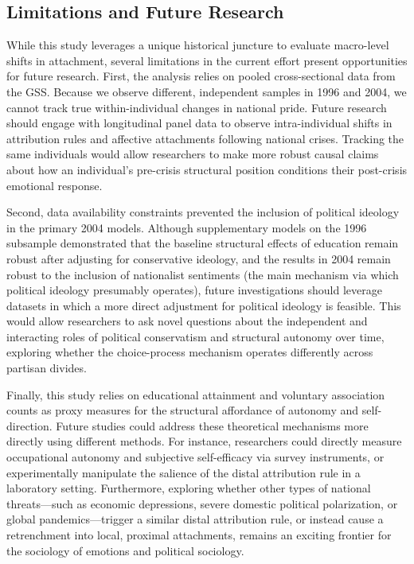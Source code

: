 \documentclass[12pt,letterpaper]{article}
\begin{document}
\subsection{Limitations and Future Research}
While this study leverages a unique historical juncture to evaluate macro-level shifts in attachment, several limitations in the current effort present opportunities for future research. First, the analysis relies on pooled cross-sectional data from the GSS. Because we observe different, independent samples in 1996 and 2004, we cannot track true within-individual changes in national pride. Future research should engage with longitudinal panel data to observe intra-individual shifts in attribution rules and affective attachments following national crises. Tracking the same individuals would allow researchers to make more robust causal claims about how an individual's pre-crisis structural position conditions their post-crisis emotional response.

Second, data availability constraints prevented the inclusion of political ideology in the primary 2004 models. Although supplementary models on the 1996 subsample demonstrated that the baseline structural effects of education remain robust after adjusting for conservative ideology, and the results in 2004 remain robust to the inclusion of nationalist sentiments (the main mechanism via which political ideology presumably operates), future investigations should leverage datasets in which a more direct adjustment for political ideology is feasible. This would allow researchers to ask novel questions about the independent and interacting roles of political conservatism and structural autonomy over time, exploring whether the choice-process mechanism operates differently across partisan divides. 

Finally, this study relies on educational attainment and voluntary association counts as proxy measures for the structural affordance of autonomy and self-direction. Future studies could address these theoretical mechanisms more directly using different methods. For instance, researchers could directly measure occupational autonomy and subjective self-efficacy via survey instruments, or experimentally manipulate the salience of the distal attribution rule in a laboratory setting. Furthermore, exploring whether other types of national threats---such as economic depressions, severe domestic political polarization, or global pandemics---trigger a similar distal attribution rule, or instead cause a retrenchment into local, proximal attachments, remains an exciting frontier for the sociology of emotions and political sociology.
\end{document}
